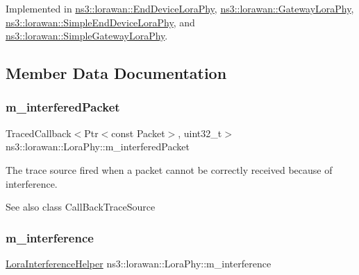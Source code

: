 Implemented in \hyperlink{classns3_1_1lorawan_1_1EndDeviceLoraPhy_a93fbde8325d792a8fc287201482f89cb}{ns3\+::lorawan\+::\+End\+Device\+Lora\+Phy}, \hyperlink{classns3_1_1lorawan_1_1GatewayLoraPhy_a08744b321b5f1b1cf84cff8d7ca8bf49}{ns3\+::lorawan\+::\+Gateway\+Lora\+Phy}, \hyperlink{classns3_1_1lorawan_1_1SimpleEndDeviceLoraPhy_ad7a421670937fa0c4ece217ae02598ad}{ns3\+::lorawan\+::\+Simple\+End\+Device\+Lora\+Phy}, and \hyperlink{classns3_1_1lorawan_1_1SimpleGatewayLoraPhy_a8ed607e9a11e4c0b759d456a35b68c40}{ns3\+::lorawan\+::\+Simple\+Gateway\+Lora\+Phy}.



\subsection{Member Data Documentation}
\mbox{\label{classns3_1_1lorawan_1_1LoraPhy_a39364c3c5adc16798f72bd0b31906d68}} 
\subsubsection{\texorpdfstring{m\+\_\+interfered\+Packet}{m\_interferedPacket}}
{\footnotesize\ttfamily Traced\+Callback$<$Ptr$<$const Packet$>$, uint32\+\_\+t$>$ ns3\+::lorawan\+::\+Lora\+Phy\+::m\+\_\+interfered\+Packet\hspace{0.3cm}{\ttfamily [protected]}}

The trace source fired when a packet cannot be correctly received because of interference.

\begin{DoxySeeAlso}{See also}
class Call\+Back\+Trace\+Source 
\end{DoxySeeAlso}
\mbox{\label{classns3_1_1lorawan_1_1LoraPhy_a1d262de59f3cc274e5506386ad5ab2fc}} 
\subsubsection{\texorpdfstring{m\+\_\+interference}{m\_interference}}
{\footnotesize\ttfamily \hyperlink{classns3_1_1lorawan_1_1LoraInterferenceHelper}{Lora\+Interference\+Helper} ns3\+::lorawan\+::\+Lora\+Phy\+::m\+\_\+interference\hspace{0.3cm}{\ttfamily [protected]}}

